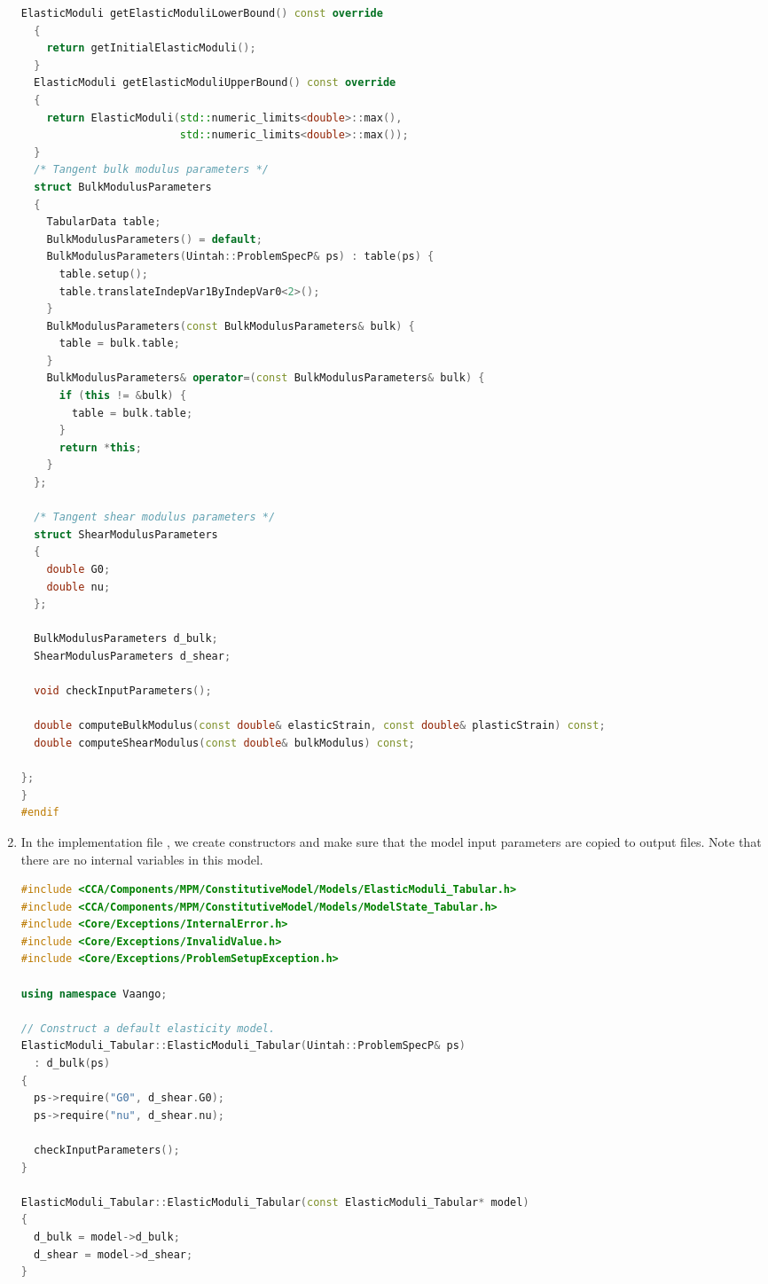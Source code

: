 \begin{enumerate}
\begin{lstlisting}[language=Cpp]
  ElasticModuli getElasticModuliLowerBound() const override
  {
    return getInitialElasticModuli();
  }
  ElasticModuli getElasticModuliUpperBound() const override
  {
    return ElasticModuli(std::numeric_limits<double>::max(),
                         std::numeric_limits<double>::max());
  }
  /* Tangent bulk modulus parameters */
  struct BulkModulusParameters
  {
    TabularData table;
    BulkModulusParameters() = default;
    BulkModulusParameters(Uintah::ProblemSpecP& ps) : table(ps) {
      table.setup();
      table.translateIndepVar1ByIndepVar0<2>();
    }
    BulkModulusParameters(const BulkModulusParameters& bulk) {
      table = bulk.table;
    }
    BulkModulusParameters& operator=(const BulkModulusParameters& bulk) {
      if (this != &bulk) {
        table = bulk.table;
      }
      return *this;
    }
  };

  /* Tangent shear modulus parameters */
  struct ShearModulusParameters
  {
    double G0;
    double nu;
  };

  BulkModulusParameters d_bulk;
  ShearModulusParameters d_shear;

  void checkInputParameters();

  double computeBulkModulus(const double& elasticStrain, const double& plasticStrain) const;
  double computeShearModulus(const double& bulkModulus) const;

};
}
#endif
\end{lstlisting}

  \item In the implementation file , we create constructors and make
        sure that the model input parameters are copied to output files.  Note that there are
        no internal variables in this model.
\begin{lstlisting}[language=Cpp]
#include <CCA/Components/MPM/ConstitutiveModel/Models/ElasticModuli_Tabular.h>
#include <CCA/Components/MPM/ConstitutiveModel/Models/ModelState_Tabular.h>
#include <Core/Exceptions/InternalError.h>
#include <Core/Exceptions/InvalidValue.h>
#include <Core/Exceptions/ProblemSetupException.h>

using namespace Vaango;

// Construct a default elasticity model.
ElasticModuli_Tabular::ElasticModuli_Tabular(Uintah::ProblemSpecP& ps)
  : d_bulk(ps)
{
  ps->require("G0", d_shear.G0);
  ps->require("nu", d_shear.nu);

  checkInputParameters();
}

ElasticModuli_Tabular::ElasticModuli_Tabular(const ElasticModuli_Tabular* model)
{
  d_bulk = model->d_bulk;
  d_shear = model->d_shear;
}


\end{lstlisting}
\end{enumerate}
